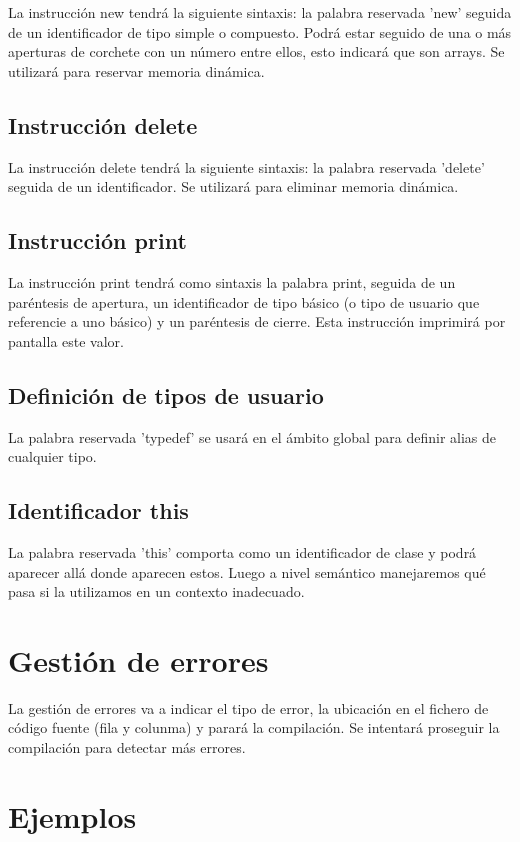 \documentclass{article}
\begin{document}
La instrucción new tendrá la siguiente sintaxis: la palabra reservada 'new' seguida de un identificador de tipo simple o compuesto. Podrá estar seguido de una o más aperturas de corchete con un número entre ellos, esto indicará que son arrays. Se utilizará para reservar memoria dinámica.

\subsection{Instrucción delete\footnotemark[1]}

La instrucción delete tendrá la siguiente sintaxis: la palabra reservada 'delete' seguida de un identificador. Se utilizará para eliminar memoria dinámica.

\subsection{Instrucción print}

La instrucción print tendrá como sintaxis la palabra print, seguida de un paréntesis de apertura, un identificador de tipo básico (o tipo de usuario que referencie a uno básico) y un paréntesis de cierre. Esta instrucción imprimirá por pantalla este valor.

\subsection{Definición de tipos de usuario}
La palabra reservada 'typedef' se usará en el ámbito global para definir alias de cualquier tipo.

\subsection{Identificador this}

La palabra reservada 'this' comporta como un identificador de clase y podrá aparecer allá donde aparecen estos. Luego a nivel semántico manejaremos qué pasa si la utilizamos en un contexto inadecuado.


\section{Gestión de errores}
La gestión de errores va a indicar el tipo de error, la ubicación en el fichero de código fuente (fila y colunma) y parará la compilación. Se intentará proseguir la compilación para detectar más errores.

\section{Ejemplos}
\end{document}
